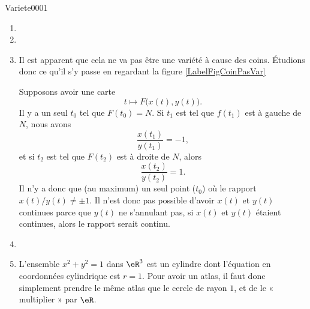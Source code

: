 \begin{corrige}{Variete0001}
\begin{enumerate}
		\item
		\item
		\item
		      Il est apparent que cela ne va pas être une variété à cause des coins. Étudions donc ce qu'il s'y passe en regardant la figure \ref{LabelFigCoinPasVar}
		      \newcommand{\CaptionFigCoinPasVar}{Ceci n'est pas une variété. Même pas le dessin d'une variété.}
		      
		      Supposons avoir une carte
		      \begin{equation}
			      t\mapsto F\big( x(t),y(t) \big).
		      \end{equation}
		      Il y a un seul $t_0$ tel que $F(t_0)=N$. Si $t_1$ est tel que $f(t_1)$ est à gauche de $N$, nous avons
		      \begin{equation}
			      \frac{ x(t_1) }{ y(t_1) }=-1,
		      \end{equation}
		      et si $t_2$ est tel que $F(t_2)$ est à droite de $N$, alors
		      \begin{equation}
			      \frac{ x(t_2) }{ y(t_2) }=1.
		      \end{equation}
		      Il n'y a donc que (au maximum) un seul point ($t_0$) où le rapport $x(t)/y(t)\neq\pm 1$. Il n'est donc pas possible d'avoir $x(t)$ et $y(t)$ continues parce que $y(t)$ ne s'annulant pas, si $x(t)$ et $y(t)$ étaient continues, alors le rapport serait continu.

		\item
		\item
		      L'ensemble $x^2+y^2=1$ dans $\eR^3$ est un cylindre dont l'équation en coordonnées cylindrique est $r=1$. Pour avoir un atlas, il faut donc simplement prendre le même atlas que le cercle de rayon $1$, et de le « multiplier » par $\eR$.


\end{enumerate}
\end{corrige}
